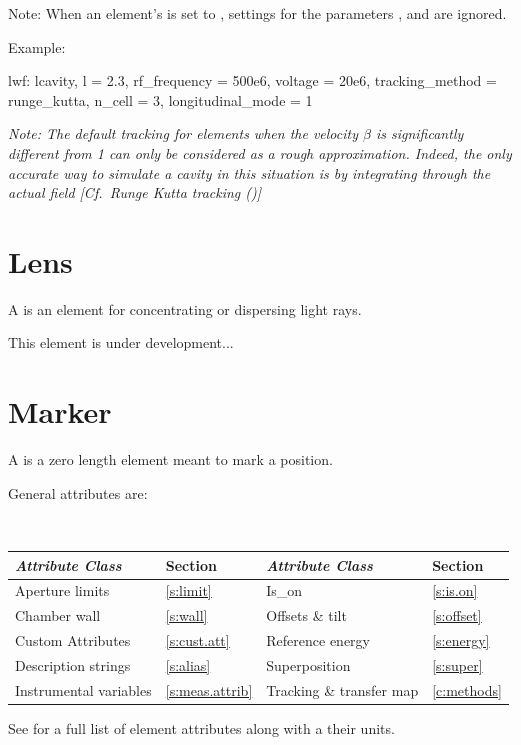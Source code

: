 {Note: When an element's  is set to , settings for the
parameters , and  are ignored.

Example:
\begin{example}
  lwf: lcavity, l = 2.3, rf_frequency = 500e6, voltage = 20e6,
         tracking_method = runge_kutta, n_cell = 3, longitudinal_mode = 1
\end{example}

{\em Note: The default  tracking for  elements when the velocity
$\beta$ is significantly different from 1 can only be considered as a rough approximation. Indeed,
the only accurate way to simulate a cavity in this situation is by integrating through the actual
field [Cf.~Runge Kutta tracking ()]}

\section{Lens}
\label{s:lens}

A  is an element for concentrating or dispersing light rays.

This element is under development...

\section{Marker}
\label{s:mark}

A  is a zero length element meant to mark a position. 

General  attributes are:
\begin{center} 
\tt
\begin{tabular}{llll} \toprule
  {\sl Attribute Class}      & Section             & {\sl Attribute Class}        & Section         \\ \midrule
  Aperture limits            & \ref{s:limit}       & Is_on                        & \ref{s:is.on}   \\ 
  Chamber wall               & \ref{s:wall}        & Offsets \& tilt              & \ref{s:offset}  \\
  Custom Attributes          & \ref{s:cust.att}    & Reference energy             & \ref{s:energy}  \\
  Description strings        & \ref{s:alias}       & Superposition                & \ref{s:super}   \\
  Instrumental variables     & \ref{s:meas.attrib} & Tracking \& transfer map     & \ref{c:methods} \\ 
  \bottomrule
\end{tabular}
\end{center}
\toffset
See  for a full list of element attributes along with a their units.

}
